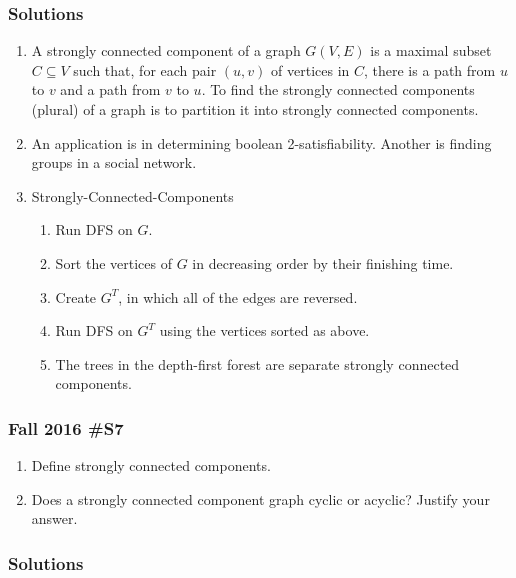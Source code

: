 \subsubsection{Solutions}

\begin{enumerate}[label=\alph*.]
	\item A strongly connected component of a graph $G(V,E)$ is a maximal subset $C \subseteq V$ such that, for each pair $(u,v)$ of vertices in $C$, there is a path from $u$ to $v$ and a path from $v$ to $u$.  To find the strongly connected components (plural) of a graph is to partition it into strongly connected components.  
	\item An application is in determining boolean 2-satisfiability.  Another is finding groups in a social network.  
	\item Strongly-Connected-Components
	\begin{enumerate}[label=\arabic*.]
		\item Run DFS on $G$.
		\item Sort the vertices of $G$ in decreasing order by their finishing time.
		\item Create $G^T$, in which all of the edges are reversed.  
		\item Run DFS on $G^T$ using the vertices sorted as above. 
		\item The trees in the depth-first forest are separate strongly connected components.  
	\end{enumerate}
\end{enumerate}
	
	
\subsubsection{Fall 2016 \#S7}

\begin{enumerate}
		\item Define strongly connected components.
		\item Does a strongly connected component graph cyclic or acyclic?  Justify your answer.  
	\end{enumerate}
	
\subsubsection{Solutions}


